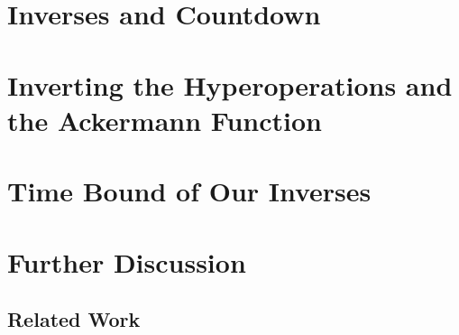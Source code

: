 \documentclass[a4paper,USenglish,cleveref, autoref]{lipics-v2019}
\theoremstyle{plain}
\theoremstyle{definition}
\begin{document}
\section{Inverses and Countdown}
\label{sec:countdown}


\section{Inverting the Hyperoperations and the Ackermann Function}
\label{sec: inv-hyperop}


\section{Time Bound of Our Inverses}
\label{sec: inv-ack}


\section{Further Discussion}
\label{sec: discussion}


\subsection{Related Work}









\end{document}
